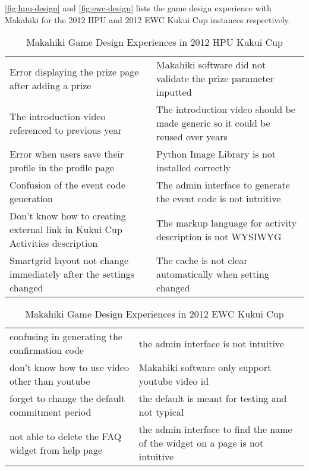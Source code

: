\autoref{fig:hpu-design} and \autoref{fig:ewc-design} lists the game design experience with Makahiki for the 2012 HPU and 2012 EWC Kukui Cup instances respectively. 

\begin{table}[ht!]
  \centering
  \begin{tabular}{|P{0.5\columnwidth}|P{0.4\columnwidth}|}
    \hline
    \centering {} &   \\
    \hline
    Error displaying the prize page after adding a prize  & Makahiki software did not validate the prize parameter inputted \\
    \hline
    The introduction video referenced to previous year &  The introduction video should be made generic so it could be reused over years \\
    \hline
    Error when users save their profile in the profile page & Python Image Library is not installed correctly\\
    \hline
    Confusion of the event code generation & The admin interface to generate the event code is not intuitive\\
    \hline
    Don't know how to creating external link in Kukui Cup Activities description & The markup language for activity description is not WYSIWYG \\
    \hline
    Smartgrid layout not change immediately after the settings changed & The cache is not clear automatically when setting changed\\
    \hline
  \end{tabular}
  \caption{Makahiki Game Design Experiences in 2012 HPU Kukui Cup}
  \label{fig:hpu-design}
\end{table}

\begin{table}[ht!]
  \centering
  \begin{tabular}{|P{0.5\columnwidth}|P{0.4\columnwidth}|}
    \hline
    \centering {} &  \\
    \hline
    confusing in generating the confirmation code  & the admin interface is not intuitive \\
    \hline
    don't know how to use video other than youtube &  Makahiki software only support youtube video id \\
    \hline
    forget to change the default commitment period & the default is meant for testing and not typical\\
    \hline
    not able to delete the FAQ widget from help page & the admin interface to find the name of the widget on a page is not intuitive \\
    \hline
  \end{tabular}
  \caption{Makahiki Game Design Experiences in 2012 EWC Kukui Cup}
  \label{fig:ewc-design}
\end{table}

